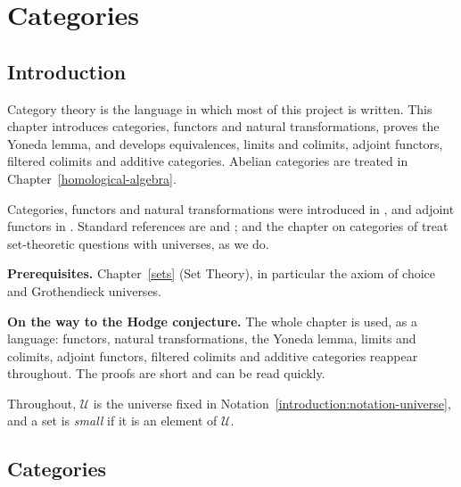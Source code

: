 \chapter{Categories}\label{categories}

\section{Introduction}\label{categories:section-introduction}

Category theory is the language in which most of this project is written.
This chapter introduces categories, functors and natural transformations,
proves the Yoneda lemma, and develops equivalences, limits and colimits,
adjoint functors, filtered colimits and additive categories. Abelian
categories are treated in Chapter~\ref{homological-algebra}.

Categories, functors and natural transformations were introduced in
\cite{eilenberg-maclane-1945}, and adjoint functors in \cite{kan-1958}.
Standard references are \cite{maclane-categories} and \cite{riehl-context};
\cite{kashiwara-schapira} and the chapter on categories of
\cite{stacks-project} treat set-theoretic questions with universes, as we do.

\noindent\textbf{Prerequisites.} Chapter~\ref{sets} (Set Theory), in
particular the axiom of choice and Grothendieck universes.

\noindent\textbf{On the way to the Hodge conjecture.} The whole chapter is used, as a language: functors, natural transformations, the Yoneda lemma, limits and colimits, adjoint functors, filtered
colimits and additive categories reappear throughout. The proofs are short and can be read quickly.

Throughout, $\mathcal{U}$ is the universe fixed in
Notation~\ref{introduction:notation-universe}, and a set is \emph{small} if it
is an element of $\mathcal{U}$.

\section{Categories}\label{categories:section-categories}

